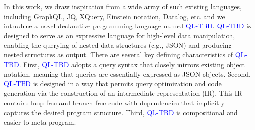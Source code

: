 \documentclass[runningheads]{llncs}
\newcommand{\lang}{\textcolor{blue}{QL-TBD}}
\begin{document}
In this work, we draw inspiration from a wide array of such existing languages,
including GraphQL, JQ, XQuery, Einstein notation, Datalog, etc. and 
we introduce a novel declarative programming language named \lang{}.
\lang{} is designed to serve as an expressive language for high-level data
manipulation, enabling the querying of nested data structures (e.g., JSON)
and producing nested structures as output.
There are several key defining characteristics of \lang{}.
First, \lang{} adopts a query syntax that closely mirrors existing object notation,
meaning that queries are essentially expressed as JSON objects.
Second, \lang{} is designed in a way that permits query optimization and
code generation via the construction of an intermediate representation (IR).
This IR contains loop-free and branch-free code with dependencies that implicitly
captures the desired program structure.
Third, \lang{} is compositional and easier to meta-program.
\end{document}
